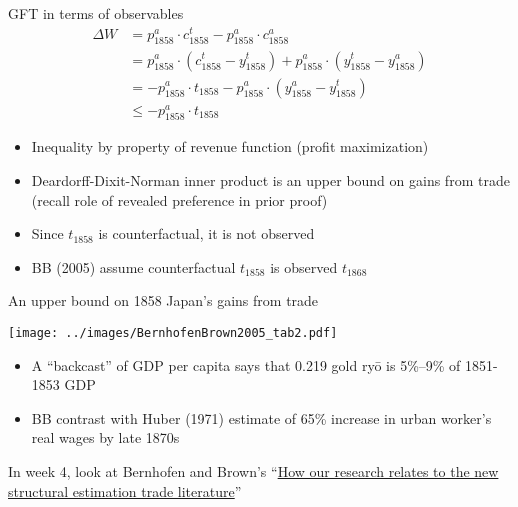 \documentclass[10pt,notes=hide]{beamer}
\begin{document}
\begin{frame}{GFT in terms of observables}
\begin{align*}
\Delta W 
&= p^a_{\text{1858}} \cdot c^t_{\text{1858}} - p^a_{\text{1858}} \cdot c^a_{\text{1858}} \\
&= p^a_{\text{1858}} \cdot (c^t_{\text{1858}} - y^t_{\text{1858}}) + p^a_{\text{1858}} \cdot (y^t_{\text{1858}} -y^a_{\text{1858}}) \\
&= -p^a_{\text{1858}} \cdot t_{\text{1858}} - p^a_{\text{1858}} \cdot (y^a_{\text{1858}} - y^t_{\text{1858}}) \\
&\leq -p^a_{\text{1858}} \cdot t_{\text{1858}}
\end{align*}
\begin{itemize}
	\item Inequality by property of revenue function (profit maximization)
	\item Deardorff-Dixit-Norman inner product is an upper bound on gains from trade (recall role of revealed preference in prior proof)
	\item Since $t_{\text{1858}}$ is counterfactual, it is not observed
	\item BB (2005) assume counterfactual $t_{\text{1858}}$ is observed $t_{\text{1868}}$
\end{itemize}
\end{frame}
\begin{frame}{An upper bound on 1858 Japan's gains from trade}
\begin{center}\texttt{[image: ../images/BernhofenBrown2005\_tab2.pdf]}\end{center}
\begin{itemize}
	\item A ``backcast'' of GDP per capita says that 0.219 gold ry\={o} is 5\%--9\% of 1851-1853 GDP 
	\item BB contrast with Huber (1971) estimate of 65\% increase in urban worker's real wages by late 1870s
\end{itemize}
In week 4, look at Bernhofen and Brown's ``\href{http://microeconomicinsights.org/gains-trade-evidence-nineteenth-century-japan/}{How our research relates to the new structural estimation trade literature}''
\end{frame}
\end{document}
